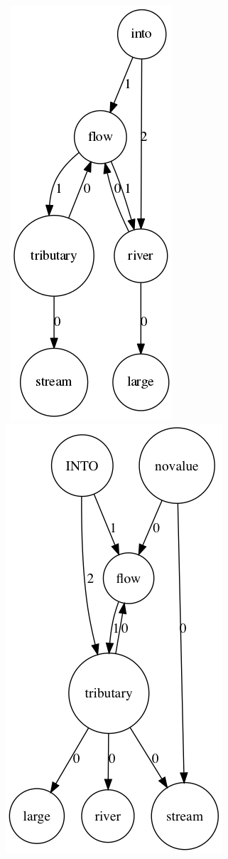 \documentclass[twoside,b5paper,10pt]{article}
\begin{document}
\begin{figure}[htb]
  \vspace{3pt}
  \centerline{
  \hbox{
  \hspace{0.0in}
        \includegraphics[scale=0.5]{Figure/tributary.png}
        \hspace{0.1\columnwidth}
        \includegraphics[scale=0.5]{Figure/tributarynew.png}
}}
\end{figure}
\end{document}
